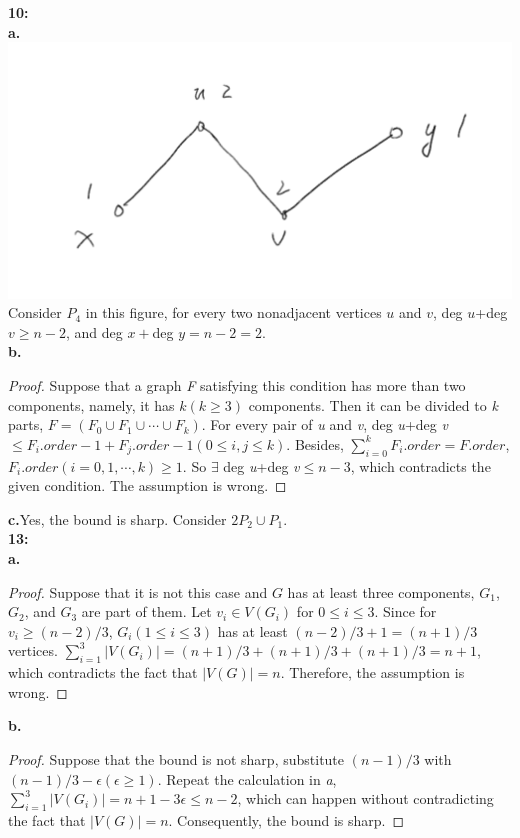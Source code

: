 \documentclass[11pt]{article}
\begin{document}
\textbf{10:}\\
\textbf{a.}\\
\includegraphics[scale=0.4]{4.png}\\
Consider $P_4$ in this figure, for every two nonadjacent vertices $u$ and $v$, deg $u$+deg $v\ge n-2$, and deg $x+$deg $y=n-2=2.$\\
\textbf{b.}
\begin{proof}
Suppose that a graph \emph{F} satisfying this condition has more than two components, namely, it has $k(k\ge3)$ components. Then it can be divided to \emph{k} parts, $F=(F_0\cup F_1\cup\cdots\cup F_k)$. For every pair of \emph{u} and \emph{v}, deg \emph{u}+deg \emph{v}$\le F_i.order-1+F_j.order-1(0\le i,j\le k)$. Besides, $\sum_{i=0}^{k}F_i.order=F.order$, $F_i.order(i=0,1,\cdots,k)\ge1.$ So $\exists$ deg \emph{u}+deg \emph{v}$\le n-3$, which contradicts the given condition. The assumption is wrong.
\end{proof}
\textbf{c.}Yes, the bound is sharp. Consider $2P_2\cup P_1.$\\
\textbf{13:}\\
\textbf{a.}
\begin{proof}
Suppose that it is not this case and $G$ has at least three components, $G_1$, $G_2$, and $G_3$ are part of them. Let $v_i\in V(G_i)$ for $0\le i\le 3$. Since for $v_i\ge(n-2)/3$, $G_i(1\le i\le3)$ has at least $(n-2)/3+1=(n+1)/3$ vertices. $\sum_{i=1}^{3}|V(G_i)|=(n+1)/3+(n+1)/3+(n+1)/3=n+1$, which contradicts the fact that $|V(G)|=n$. Therefore, the assumption is wrong.
\end{proof}
\textbf{b.}
\begin{proof}
Suppose that the bound is not sharp, substitute $(n-1)/3$ with $(n-1)/3-\epsilon(\epsilon\ge1)$. Repeat the calculation in \emph{a}, $\sum_{i=1}^{3}|V(G_i)|=n+1-3\epsilon\le n-2$, which can happen without contradicting the fact that $|V(G)|=n$. Consequently, the bound is sharp.
\end{proof}
\end{document}
